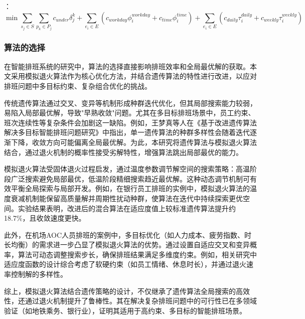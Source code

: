 \documentclass{ctexart}
\begin{document}
{}：
\begin{equation}
\min \sum_{s_j \in S}\sum_{p_k \in P_j} c_{under}\delta_j^k + 
\sum_{e_i \in E}\left(c_{workday}\phi_i^{workday} + c_{time}\phi_i^{time}\right) +
\sum_{e_i \in E}\left(c_{daily}\tau_i^{daily} + c_{weekly}\tau_i^{weekly}\right)
\end{equation}

\subsubsection{算法的选择}
在智能排班系统的研究中，算法的选择直接影响排班效率和全局最优解的获取。本文采用模拟退火算法作为核心优化方法，并结合遗传算法的特性进行改进，以应对排班问题中多目标约束、复杂组合优化的挑战。

传统遗传算法通过交叉、变异等机制形成种群迭代优化，但其局部搜索能力较弱，易陷入局部最优解，导致"早熟收敛"问题。尤其在多目标排班场景中，员工约束、班次连续性等复杂条件会加剧这一缺陷。例如，王梦真等人在《基于改进遗传算法解决多目标智能排班问题研究》中指出，单一遗传算法的种群多样性会随着迭代逐渐下降，收敛方向可能偏离全局最优解\cite{DNZS202202029}。为此，本研究将遗传算法与模拟退火算法结合，通过退火机制的概率性接受劣解特性，增强算法跳出局部最优的能力。

模拟退火算法受固体退火过程启发，通过温度参数调节解空间的搜索策略：高温阶段广泛搜索避免局部最优，低温阶段精细搜索趋近最优解\cite{RJDK202301028}。这种动态调节机制可有效平衡全局探索与局部开发。例如，在银行员工排班的实例中，模拟退火算法的温度衰减机制能保留高质量解并周期性扰动种群，使算法在迭代中持续探索更优空间\cite{1016015859.nh}。实验结果表明，改进后的混合算法在适应度值上较标准遗传算法提升约18.7\%，且收敛速度更快\cite{DNZS202202029}。

此外，在机场AOC人员排班的案例中，多目标优化（如人力成本、疲劳指数、时长均衡）的需求进一步凸显了模拟退火算法的优势。通过设置自适应交叉和变异概率，算法可动态调整搜索步长，确保排班结果满足多维度约束\cite{1022506340.nh}。例如，相关研究中适应度函数的设计综合考虑了软硬约束（如员工情绪、休息时长），并通过退火速率控制解的多样性。

综上，模拟退火算法结合遗传策略的设计，不仅继承了遗传算法全局搜索的高效性，还通过退火机制提升了鲁棒性。其在解决复杂排班问题中的可行性已在多领域验证（如地铁乘务\cite{1014151664.nh}、银行业\cite{1016015859.nh}），证明其适用于高约束、多目标的智能排班场景。
\end{document}
